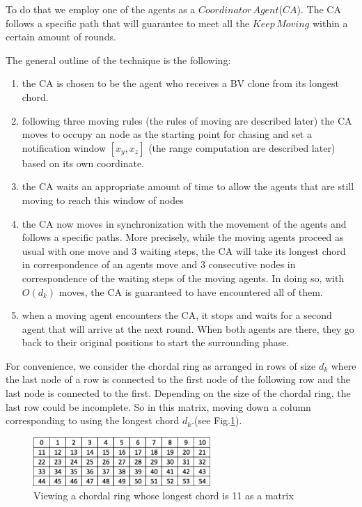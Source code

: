 
To do that we employ one of the agents as a  $Coordinator\,Agent$($CA$). The CA follows a specific path that will guarantee to meet all the $Keep\,Moving$ within a certain amount of rounds.


The general outline of the technique is the following:
\begin{enumerate}
\item the CA is chosen to be the agent who receives a BV clone from its longest chord. %
\item following three moving rules (the rules of moving are described later) the CA moves to occupy an node as the starting point for chasing and set a notification window $[x_y,x_z]$ (the range computation are described later) based on its own coordinate. 
\item the CA waits an appropriate amount of time to allow the agents that are still moving to reach this window of nodes
\item the CA now moves in synchronization with the movement of the agents and follows a specific paths. 
More precisely, while the moving agents proceed as usual  with one move and 3 waiting steps, the CA will take its longest chord in correspondence of an agents move and 3 consecutive nodes in correspondence of the waiting steps of the moving agents. In doing so, with $O(d_k)$ moves, the CA is guaranteed to have encountered  all of them.
\item when a moving agent encounters the CA, it stops and waits for a second agent that will arrive at the next round. When both agents are there, they go back to their original positions to start the surrounding phase.
\end{enumerate}


For   convenience,  we consider the chordal ring as arranged in rows of size $d_k$ where the last node of a row is connected to the first node of the following row and the last node is connected to the first. Depending on the size of the chordal ring, the last row could be incomplete. So in this matrix, moving down a column corresponding to using the longest chord $d_k$.(see Fig.\ref{fig:matrix}). 
\begin{figure}[H]
  \centering  
  \includegraphics[width=0.6\textwidth]{figures/matrix.png}
  \caption{Viewing a chordal ring whose longest chord is 11 as a matrix}\label{fig:matrix}
\end{figure}

